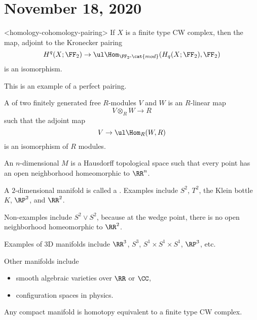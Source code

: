 \documentclass{standalone}
\begin{document}
\chapter{November 18, 2020}

\begin{proposition}<homology-cohomology-pairing>
  If \(X\) is a finite type CW complex, then the map,
  adjoint to the Kronecker pairing
  \[
    H^q(X; \FF_2)
      \to \ul\Hom_{\FF_2\text{-}\cat{mod}}(H_q(X; \FF_2), \FF_2) %
  \]
  is an isomorphism.
\end{proposition}
This is an example of a perfect pairing.

\begin{definition}
  A  of two finitely generated free \(R\)-modules
  \(V\) and \(W\) is an \(R\)-linear map
  \[
    V \otimes_R W \to R
  \]
  such that the adjoint map
  \[
    V \to \ul\Hom_R(W, R)
  \]
  is an isomorphism of \(R\) modules.
\end{definition}

\begin{definition}
  An \(n\)-dimensional  \(M\) is a Hausdorff topological space
  such that every point has an open neighborhood homeomorphic to \(\RR^n\).
\end{definition}

\begin{example}
  A \(2\)-dimensional manifold is called a .
  Examples include \(S^2\),
                   \(T^2\),
                   the Klein bottle \(K\),
                   \(\RP^2\), and
                   \(\RR^2\).
  
  Non-examples include \(S^2 \vee S^2\), because at the wedge point,
  there is no open neighborhood homeomorphic to \(\RR^2\).

  Examples of 3D manifolds include \(\RR^3\),
                                   \(S^3\),
                                   \(S^1 \times S^1 \times S^1\),
                                   \(\RP^3\), etc.

  Other manifolds include
  \begin{itemize}[nosep]
    \item smooth algebraic varieties over \(\RR\) or \(\CC\),
    \item configuration spaces in physics.
  \end{itemize}
\end{example}

\begin{fact}
  Any compact manifold is homotopy equivalent to a finite type CW complex.
\end{fact}
\end{document}

